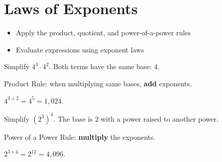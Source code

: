 \section{Laws of Exponents}

\begin{stepGoal}
\begin{itemize}
    \item Apply the product, quotient, and power-of-a-power rules
    \item Evaluate expressions using exponent laws
\end{itemize}
\end{stepGoal}

\begin{stepVocabBox}
\end{stepVocabBox}

\begin{stepsCard}
\end{stepsCard}

\begin{stepExample}{Simplify $4^3 \cdot 4^2$.}
     Both terms have the same base: $4$.

     Product Rule: when multiplying same bases, \textbf{add} exponents.

     $4^{3+2} = 4^5 = 1{,}024$.
\end{stepExample}

\begin{stepExample}{Simplify $(2^3)^4$.}
     The base is $2$ with a power raised to another power.

     Power of a Power Rule: \textbf{multiply} the exponents.

     $2^{3 \times 4} = 2^{12} = 4{,}096$.
\end{stepExample}

